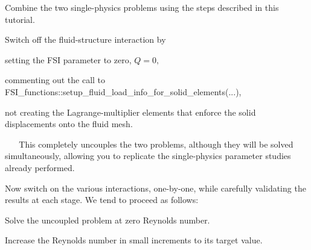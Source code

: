 \begin{DoxyItemize}
\begin{DoxyEnumerate}
\item Combine the two single-\/physics problems using the steps described in this tutorial. ~\newline
~\newline

\item Switch off the fluid-\/structure interaction by ~\newline
~\newline

\begin{DoxyEnumerate}
\item setting the F\+SI parameter to zero, $ Q = 0, $ ~\newline
~\newline

\item commenting out the call to {\ttfamily F\+S\+I\+\_\+functions\+::setup\+\_\+fluid\+\_\+load\+\_\+info\+\_\+for\+\_\+solid\+\_\+elements}(...), ~\newline
~\newline

\item not creating the Lagrange-\/multiplier elements that enforce the solid displacements onto the fluid mesh.
\end{DoxyEnumerate}~\newline
~\newline
 This completely uncouples the two problems, although they will be solved simultaneously, allowing you to replicate the single-\/physics parameter studies already performed. ~\newline
~\newline

\item Now switch on the various interactions, one-\/by-\/one, while carefully validating the results at each stage. We tend to proceed as follows\+: ~\newline
~\newline

\begin{DoxyEnumerate}
\item Solve the uncoupled problem at zero Reynolds number. ~\newline
~\newline

\item Increase the Reynolds number in small increments to its target value. ~\newline
~\newline


\end{DoxyEnumerate}
\end{DoxyEnumerate}
\end{DoxyItemize}
